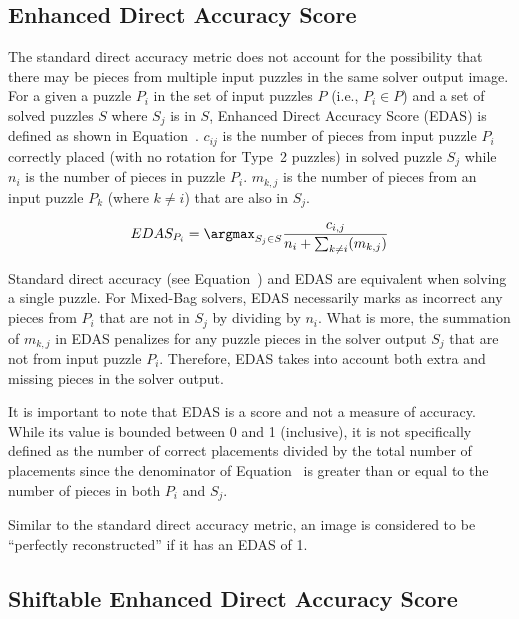 \subsection{Enhanced Direct Accuracy Score}\label{sec:enhancedDirectAccuracyScore}

The standard direct accuracy metric does not account for the possibility that there may be pieces from multiple input puzzles in the same solver output image.  For a given a puzzle $P_i$ in the set of input puzzles $P$ (i.e., $P_i \in P$) and a set of solved puzzles $S$ where $S_j$ is in $S$, Enhanced Direct Accuracy Score (EDAS) is defined as shown in Equation~.  $c_{ij}$ is the number of pieces from input puzzle $P_i$ correctly placed (with no rotation for Type~2 puzzles) in solved puzzle $S_j$ while $n_i$ is the number of pieces in puzzle $P_i$. $m_{k,j}$ is the number of pieces from an input puzzle $P_k$ (where $k \ne i$) that are also in $S_j$.

\begin{equation} \label{eq:enhancedDirectAccuracyScore}
EDAS_{P_i} = \argmax_{S_j \in S}\frac{c_{i,j}}{n_i + \sum_{k \ne i}(m_{k,j})}
\end{equation}

Standard direct accuracy (see Equation~) and EDAS are equivalent when solving a single puzzle. For Mixed-Bag solvers, EDAS necessarily marks as incorrect any pieces from $P_i$ that are not in $S_j$ by dividing by $n_i$.  What is more, the summation of $m_{k,j}$ in EDAS penalizes for any puzzle pieces in the solver output $S_j$ that are not from input puzzle $P_i$.  Therefore, EDAS takes into account both extra and missing pieces in the solver output.

It is important to note that EDAS is a score and not a measure of accuracy. While its value is bounded between 0 and 1 (inclusive), it is not specifically defined as the number of correct placements divided by the total number of placements since the denominator of Equation~ is greater than or equal to the number of pieces in both $P_i$ and $S_j$.

Similar to the standard direct accuracy metric, an image is considered to be ``perfectly reconstructed'' if it has an EDAS of 1.

\subsection{Shiftable Enhanced Direct Accuracy Score}\label{sec:shiftableEnhancedDirectAccuracy}

